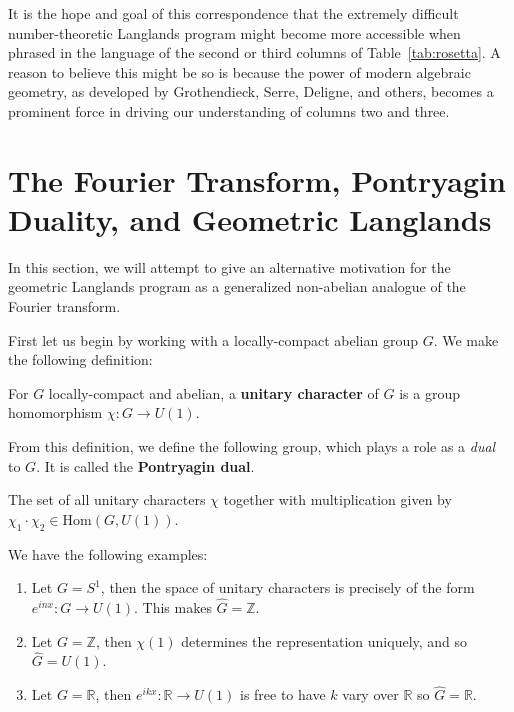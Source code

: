 It is the hope and goal of this correspondence that the extremely difficult number-theoretic Langlands program might become more accessible when phrased in the language of the second or third columns of Table~\ref{tab:rosetta}. A reason to believe this might be so is because the power of modern algebraic geometry, as developed by Grothendieck, Serre, Deligne, and others, becomes a prominent force in driving our understanding of columns two and three. 



\section{The Fourier Transform, Pontryagin Duality, and Geometric Langlands} %
\label{sec:the_fourier_transform_pontryagin_duality_and_geometric_langlands}
		
In this section, we will attempt to give an alternative motivation for the geometric Langlands program as a generalized non-abelian analogue of the Fourier transform. 

First let us begin by working with a locally-compact abelian group $G$. We make the following definition:
\begin{defn}
	For $G$ locally-compact and abelian, a \textbf{unitary character} of $G$ is a group homomorphism $\chi: G \to U(1)$.
\end{defn}
From this definition, we define the following group, which plays a role as a \emph{dual} to $G$. It is called the \textbf{Pontryagin dual}.
\begin{defn}
	The set of all unitary characters $\chi$ together with multiplication given by $\chi_1 \cdot \chi_2 \in \mathrm{Hom}(G, U(1))$.
\end{defn}

\begin{eg}
	We have the following examples:
	\begin{enumerate}
		\item Let $G = S^1$, then the space of unitary characters is precisely of the form $e^{inx}: G \to U(1)$. This makes $\widehat G = \mathbb Z$.
		\item Let $G = \mathbb Z$, then $\chi(1)$ determines the representation uniquely, and so $\widehat G = U(1)$.
		\item 			Let $G = \mathbb R$, then $e^{ikx} : \mathbb R \to U(1)$ is free to have $k$ vary over $\mathbb R$ so $\widehat G = \mathbb R$.
	\end{enumerate}

\end{eg}

